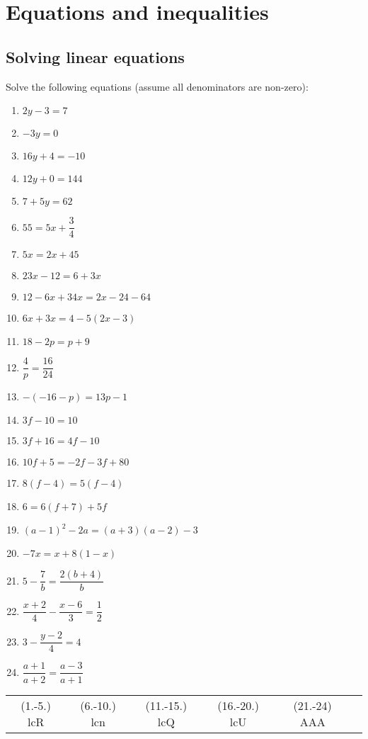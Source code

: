 \chapter{Equations and inequalities}
\section{Solving linear equations}
\begin{exercises}{}
{
Solve the following equations (assume all denominators are non-zero): \\
\begin{multicols}{2}
\begin{enumerate}[itemsep=6pt, label=\textbf{\arabic*}. ] 
\item   $2y-3=7$
\item   $-3y=0$        
\item   $16y+4=-10$        
\item   $12y+0=144$
\item   $7+5y=62$       
\item  $55=5x+\dfrac{3}{4}$ 
\item   $5x=2x+45$        
\item  $23x-12=6+3x$
\item   $12-6x+34x=2x-24-64$
\item   $6x+3x=4-5(2x-3)$
\item   $18-2p=p+9$   
\item   $\dfrac{4}{p}=\dfrac{16}{24}$
\item   $-(-16-p)=13p-1$
\item   $3f-10=10$
\item   $3f+16=4f-10$
\item   $10f+5=-2f-3f+80$
\item   $8(f-4)=5(f-4)$
\item  $6=6(f+7)+5f$      
\item $(a-1)^{2} - 2a = (a+3)(a-2) - 3$
\item $-7x = x+8(1-x)$ 
\item $5-\dfrac{7}{b} = \dfrac{2(b+4)}{b}$
\item $\dfrac{x+2}{4} - \dfrac{x-6}{3} = \dfrac{1}{2}$
\item $ 3 - \dfrac{y-2}{4} = 4$
\item $ \dfrac{a+1}{a+2} = \dfrac{a-3}{a+1}$
\end{enumerate}
\end{multicols}
\practiceinfo
\par 
\par \begin{tabular}[h]{cccccc}
(1.-5.) lcR  &  (6.-10.) lcn  &  (11.-15.) lcQ  &  (16.-20.) lcU & (21.-24) AAA\end{tabular}
}
\end{exercises}


